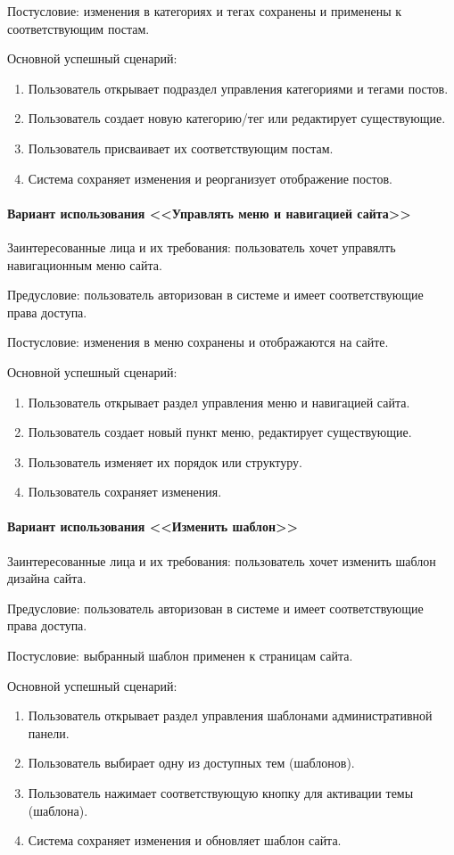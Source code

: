 Постусловие: изменения в категориях и тегах сохранены и применены к соответствующим постам.

Основной успешный сценарий:
\begin{enumerate}
	\item Пользователь открывает подраздел управления категориями и тегами постов.
	\item Пользователь создает новую категорию/тег или редактирует существующие.
	\item Пользователь присваивает их соответствующим постам.
	\item Система сохраняет изменения и реорганизует отображение постов.
\end{enumerate}

\paragraph{Вариант использования <<Управлять меню и навигацией сайта>>}
Заинтересованные лица и их требования: пользователь хочет управялть навигационным меню сайта.

Предусловие: пользователь авторизован в системе и имеет соответствующие права доступа.

Постусловие: изменения в меню сохранены и отображаются на сайте.

Основной успешный сценарий:
\begin{enumerate}
	\item Пользователь открывает раздел управления меню и навигацией сайта.
	\item Пользователь создает новый пункт меню, редактирует существующие.
	\item Пользователь изменяет их порядок или структуру.
	\item Пользователь сохраняет изменения.
\end{enumerate}

\paragraph{Вариант использования <<Изменить шаблон>>}
Заинтересованные лица и их требования: пользователь хочет изменить шаблон дизайна сайта.

Предусловие: пользователь авторизован в системе и имеет соответствующие права доступа.

Постусловие: выбранный шаблон применен к страницам сайта.

Основной успешный сценарий:
\begin{enumerate}
	\item Пользователь открывает раздел управления шаблонами административной панели.
	\item Пользователь выбирает одну из доступных тем (шаблонов).
	\item Пользователь нажимает соответствующую кнопку для активации темы (шаблона).
	\item Система сохраняет изменения и обновляет шаблон сайта.
\end{enumerate}

